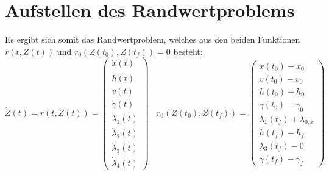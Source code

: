 \section{Aufstellen des Randwertproblems}
Es ergibt sich somit das Randwertproblem, welches aus den beiden Funktionen $r(t,Z(t))$ und $r_0(Z(t_0),Z(t_f)) = 0$ besteht:
\[\dot{Z}(t) = r(t,Z(t)) = \begin{pmatrix}
\dot{x}(t) \\
\dot{h}(t) \\
\dot{v}(t) \\
\dot{\gamma}(t) \\
\dot{\lambda}_1(t) \\ 
\dot{\lambda}_2(t) \\ 
\dot{\lambda}_3(t) \\ 
\dot{\lambda}_4(t)
\end{pmatrix}  \ \ \ \ r_0(Z(t_0),Z(t_f)) = \begin{pmatrix}
x(t_0) - x_0 \\ 
v(t_0) - v_0 \\ 
h(t_0) - h_0 \\ 
\gamma(t_0) - \gamma_0 \\
\lambda_1(t_f) + \lambda_{0,x} \\ 
h(t_f) - h_f \\ 
\lambda_3(t_f) - 0 \\ 
\gamma(t_f) - \gamma_f
\end{pmatrix}\]

